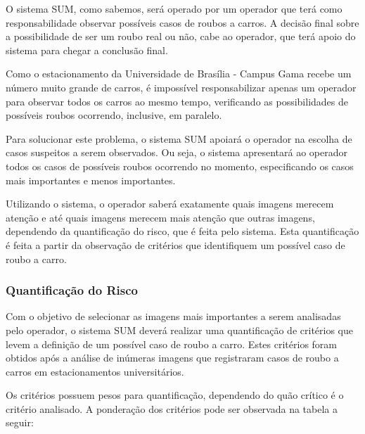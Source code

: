 
	O sistema SUM, como sabemos, será operado por um operador que terá como responsabilidade observar possíveis casos de roubos a carros. A decisão final sobre a possibilidade de ser um roubo real ou não, cabe ao operador, que terá apoio do sistema para chegar a conclusão final.
	
	Como o estacionamento da Universidade de Brasília - Campus Gama recebe um número muito grande de carros, é impossível responsabilizar apenas um operador para observar todos os carros ao mesmo tempo, verificando as possibilidades de possíveis roubos ocorrendo, inclusive, em paralelo.
	
	Para solucionar este problema, o sistema SUM apoiará o operador na escolha de casos suspeitos a serem observados. Ou seja, o sistema apresentará ao operador todos os casos de possíveis roubos ocorrendo no momento, especificando os casos mais importantes e menos importantes.
	
	Utilizando o sistema, o operador saberá exatamente quais imagens merecem atenção e até quais imagens merecem mais atenção que outras imagens, dependendo da quantificação do risco, que é feita pelo sistema. Esta quantificação é feita a partir da observação de critérios que identifiquem um possível caso de roubo a carro. 

\subsubsection{Quantificação do Risco}

	Com o objetivo de selecionar as imagens mais importantes a serem analisadas pelo operador, o sistema SUM deverá realizar uma quantificação de critérios que levem a definição de um possível caso de roubo a carro. Estes critérios foram obtidos após a análise de inúmeras imagens que registraram casos de roubo a carros em estacionamentos universitários.
	
	Os critérios possuem pesos para quantificação, dependendo do quão crítico é o critério analisado. A ponderação dos critérios pode ser observada na tabela a seguir:

